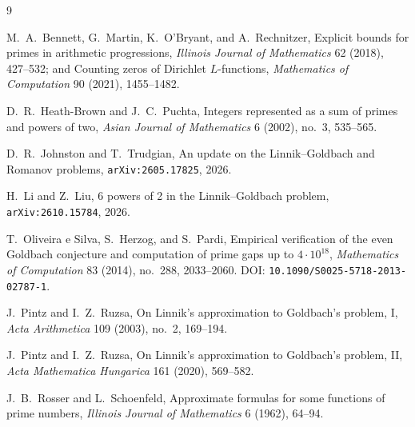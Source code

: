 \documentclass[11pt,a4paper]{article}
\begin{document}
\begin{thebibliography}{9}

M.~A.~Bennett, G.~Martin, K.~O'Bryant, and A.~Rechnitzer,
Explicit bounds for primes in arithmetic progressions,
\emph{Illinois Journal of Mathematics} 62 (2018), 427--532;
and Counting zeros of Dirichlet $L$-functions,
\emph{Mathematics of Computation} 90 (2021), 1455--1482.

D.~R.~Heath-Brown and J.~C.~Puchta,
Integers represented as a sum of primes and powers of two,
\emph{Asian Journal of Mathematics} 6 (2002), no.~3, 535--565.

D.~R.~Johnston and T.~Trudgian,
An update on the Linnik--Goldbach and Romanov problems,
\texttt{arXiv:2605.17825}, 2026.

H.~Li and Z.~Liu,
6 powers of 2 in the Linnik--Goldbach problem,
\texttt{arXiv:2610.15784}, 2026.

T.~Oliveira e Silva, S.~Herzog, and S.~Pardi,
Empirical verification of the even Goldbach conjecture and computation of prime gaps up to $4\cdot 10^{18}$,
\emph{Mathematics of Computation} 83 (2014), no.~288, 2033--2060.
DOI: \texttt{10.1090/S0025-5718-2013-02787-1}.

J.~Pintz and I.~Z.~Ruzsa,
On Linnik's approximation to Goldbach's problem, I,
\emph{Acta Arithmetica} 109 (2003), no.~2, 169--194.

J.~Pintz and I.~Z.~Ruzsa,
On Linnik's approximation to Goldbach's problem, II,
\emph{Acta Mathematica Hungarica} 161 (2020), 569--582.

J.~B.~Rosser and L.~Schoenfeld,
Approximate formulas for some functions of prime numbers,
\emph{Illinois Journal of Mathematics} 6 (1962), 64--94.

\end{thebibliography}
\end{document}
